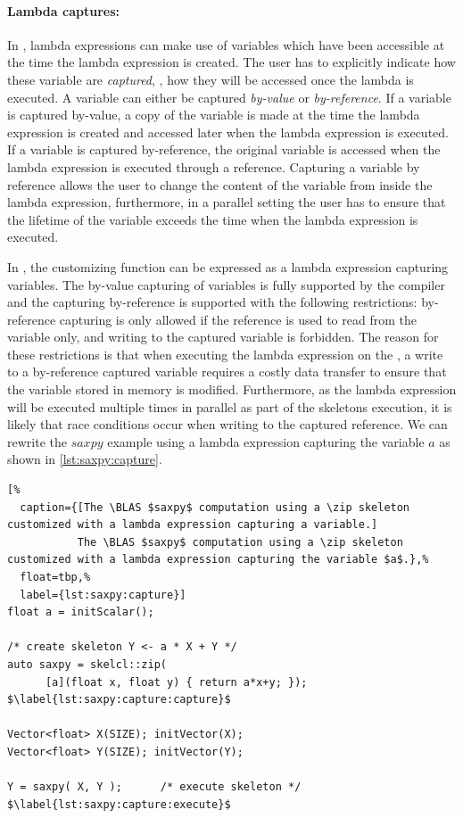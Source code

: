 \paragraph{Lambda captures:}
In \Cpp, lambda expressions can make use of variables which have been accessible at the time the lambda expression is created.
The user has to explicitly indicate how these variable are \emph{captured}, \ie, how they will be accessed once the lambda is executed.
A variable can either be captured \emph{by-value} or \emph{by-reference}.
If a variable is captured by-value, a copy of the variable is made at the time the lambda expression is created and accessed later when the lambda expression is executed.
If a variable is captured by-reference, the original variable is accessed when the lambda expression is executed through a reference.
Capturing a variable by reference allows the user to change the content of the variable from inside the lambda expression, furthermore, in a parallel setting the user has to ensure that the lifetime of the variable exceeds the time when the lambda expression is executed.

In \SkelCL, the customizing function can be expressed as a lambda expression capturing variables.
The by-value capturing of variables is fully supported by the  compiler and the capturing by-reference is supported with the following restrictions:
by-reference capturing is only allowed if the reference is used to read from the variable only, and writing to the captured variable is forbidden.
The reason for these restrictions is that when executing the lambda expression on the \GPU, a write to a by-reference captured variable requires a costly data transfer to ensure that the variable stored in \CPU memory is modified.
Furthermore, as the lambda expression will be executed multiple times in parallel as part of the skeletons execution, it is likely that race conditions occur when writing to the captured reference.
We can rewrite the $saxpy$ example using a lambda expression capturing the variable $a$ as shown in \autoref{lst:saxpy:capture}.
\begin{lstlisting}[%
  caption={[The \BLAS $saxpy$ computation using a \zip skeleton customized with a lambda expression capturing a variable.]
           The \BLAS $saxpy$ computation using a \zip skeleton customized with a lambda expression capturing the variable $a$.},%
  float=tbp,%
  label={lst:saxpy:capture}]
float a = initScalar();

/* create skeleton Y <- a * X + Y */
auto saxpy = skelcl::zip(
      [a](float x, float y) { return a*x+y; }); $\label{lst:saxpy:capture:capture}$

Vector<float> X(SIZE); initVector(X);
Vector<float> Y(SIZE); initVector(Y);

Y = saxpy( X, Y );      /* execute skeleton */ $\label{lst:saxpy:capture:execute}$
\end{lstlisting}

